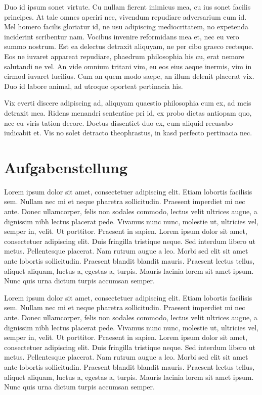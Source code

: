 Duo id ipsum sonet virtute. Cu nullam fierent inimicus mea, cu ius sonet facilis principes. At tale omnes aperiri nec, vivendum repudiare adversarium cum id. Mel homero facilis gloriatur id, ne usu adipiscing mediocritatem, no expetenda inciderint scribentur nam. Vocibus invenire reformidans mea et, nec eu vero summo nostrum. Est ea delectus detraxit aliquyam, ne per cibo graeco recteque. Eos ne iuvaret appareat repudiare, phaedrum philosophia his cu, erat nemore salutandi ne vel. An vide omnium tritani vim, eu eos eius aeque inermis, vim in eirmod iuvaret lucilius. Cum an quem modo saepe, an illum delenit placerat vix. Duo id labore animal, ad utroque oporteat pertinacia his.

Vix everti discere adipiscing ad, aliquyam quaestio philosophia cum ex, ad meis detraxit mea. Ridens menandri sententiae pri id, ex probo dictas antiopam quo, nec eu viris tation decore. Doctus dissentiet duo ex, cum aliquid recusabo iudicabit et. Vis no solet detracto theophrastus, in kasd perfecto pertinacia nec.

\section{Aufgabenstellung}
\label{einleitung_aufgabenstellung}
Lorem ipsum dolor sit amet, consectetuer adipiscing elit. Etiam lobortis facilisis sem. Nullam nec mi et neque pharetra sollicitudin. Praesent imperdiet mi nec ante. Donec ullamcorper, felis non sodales commodo, lectus velit ultrices augue, a dignissim nibh lectus placerat pede. Vivamus nunc nunc, molestie ut, ultricies vel, semper in, velit. Ut porttitor. Praesent in sapien. Lorem ipsum dolor sit amet, consectetuer adipiscing elit. Duis fringilla tristique neque. Sed interdum libero ut metus. Pellentesque placerat. Nam rutrum augue a leo. Morbi sed elit sit amet ante lobortis sollicitudin. Praesent blandit blandit mauris. Praesent lectus tellus, aliquet aliquam, luctus a, egestas a, turpis. Mauris lacinia lorem sit amet ipsum. Nunc quis urna dictum turpis accumsan semper.

Lorem ipsum dolor sit amet, consectetuer adipiscing elit. Etiam lobortis facilisis sem. Nullam nec mi et neque pharetra sollicitudin. Praesent imperdiet mi nec ante. Donec ullamcorper, felis non sodales commodo, lectus velit ultrices augue, a dignissim nibh lectus placerat pede. Vivamus nunc nunc, molestie ut, ultricies vel, semper in, velit. Ut porttitor. Praesent in sapien. Lorem ipsum dolor sit amet, consectetuer adipiscing elit. Duis fringilla tristique neque. Sed interdum libero ut metus. Pellentesque placerat. Nam rutrum augue a leo. Morbi sed elit sit amet ante lobortis sollicitudin. Praesent blandit blandit mauris. Praesent lectus tellus, aliquet aliquam, luctus a, egestas a, turpis. Mauris lacinia lorem sit amet ipsum. Nunc quis urna dictum turpis accumsan semper.

